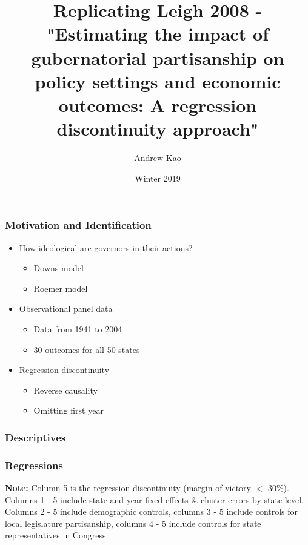 \documentclass{beamer}
\title{Replicating Leigh 2008 - "Estimating the impact of gubernatorial partisanship on policy settings
and economic outcomes: A regression discontinuity approach" }
\subtitle{}
\author{Andrew Kao}
\institute{University of Chicago}
\date{Winter 2019}
\begin{document}
 
\frame{\titlepage}
 
\begin{frame}
\frametitle{Motivation and Identification}

\begin{itemize}
\item How ideological are governors in their actions?
	\begin{itemize}
	\item Downs model 
	\item Roemer model
	\end{itemize} 
\item Observational panel data
	\begin{itemize}
	\item Data from 1941 to 2004
	\item 30 outcomes for all 50 states
	\end{itemize}
\item Regression discontinuity
	\begin{itemize}
	\item Reverse causality
	\item Omitting first year
	\end{itemize}
\end{itemize}
\end{frame}

\begin{frame}
\frametitle{Descriptives}
   
\scriptsize
    \renewcommand\arraystretch{0.75}
    \setlength\tabcolsep{2pt}



\end{frame}

\begin{frame}
\frametitle{Regressions}

\scriptsize
    \renewcommand\arraystretch{0.65}
    \setlength\tabcolsep{1pt}
    \tiny

\textbf{Note:} Column 5 is the regression discontinuity (margin of victory $<$ 30\%). Columns 1 - 5 include state and year fixed effects \& cluster errors by state level. Columns 2 - 5 include demographic controls, columns 3 - 5 include controls for local legislature partisanship, columns 4 - 5 include controls for state representatives in Congress.

\end{frame}
\end{document}
